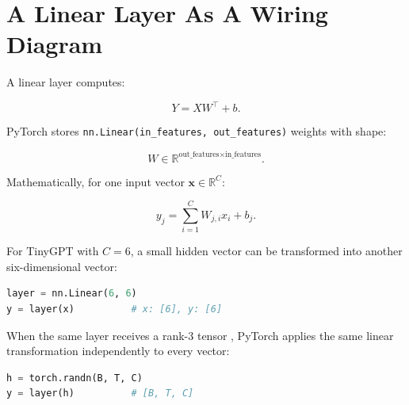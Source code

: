 \section{A Linear Layer As A Wiring Diagram}

A linear layer computes:

\[
Y = XW^\top + b.
\]

PyTorch stores \texttt{nn.Linear(in\_features, out\_features)} weights with shape:

\[
W \in \mathbb{R}^{\text{out\_features} \times \text{in\_features}}.
\]

Mathematically, for one input vector \(\mathbf{x}\in \mathbb{R}^{C}\):

\[
y_j = \sum_{i=1}^{C} W_{j,i}x_i + b_j.
\]

For TinyGPT with \(C=6\), a small hidden vector can be transformed into another six-dimensional vector:

\begin{center}
\end{center}

\begin{lstlisting}[language=Python]
layer = nn.Linear(6, 6)
y = layer(x)          # x: [6], y: [6]
\end{lstlisting}

When the same layer receives a rank-3 tensor \shape{[B,T,C]}, PyTorch applies the same linear transformation independently to every \shape{[C]} vector:

\begin{lstlisting}[language=Python]
h = torch.randn(B, T, C)
y = layer(h)          # [B, T, C]
\end{lstlisting}

